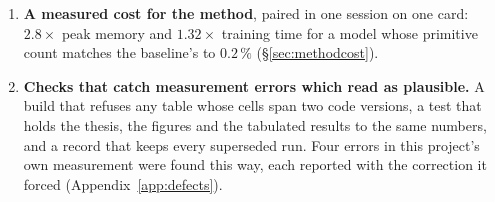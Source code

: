 \begin{enumerate}[leftmargin=1.4em,itemsep=3pt]
  \item \textbf{A measured cost for the method}, paired in one session on one
        card: $2.8\times$ peak memory and $1.32\times$ training time for a model
        whose primitive count matches the baseline's to $0.2\,\%$
        (\S\ref{sec:methodcost}).

  \item \textbf{Checks that catch measurement errors which read as plausible.}
        A build that refuses any table whose cells span two code versions, a
        test that holds the thesis, the figures and the tabulated results to the
        same numbers, and a record that keeps every superseded run. Four errors
        in this project's own measurement were found this way, each reported
        with the correction it forced (Appendix~\ref{app:defects}).
\end{enumerate}

